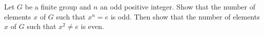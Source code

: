 \begin{assignment}[
  header=HeaderA,
  body=BodyA,
  title={Homework 1},
  duedate={3-February-2026},
  toc=false,
  toctitle={This appears on the Table of contents.},
  exlist=false
]




\begin{exer}[Problem 2.37]
Let $G$ be a finite group and $n$ an odd positive integer. Show that the number of elements $x$ of $G$ such that $x^n = e$ is odd. Then show that the number of elements $x$ of $G$ such that $x^2 \neq e$ is even.




\end{exer}
\end{assignment}
